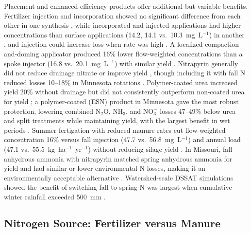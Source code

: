 Placement and enhanced-efficiency products offer additional but variable benefits. Fertilizer injection and incorporation showed no significant difference from each other in one synthesis \parencite{Liu2021}, while incorporated and injected applications had higher concentrations than surface applications (14.2, 14.1 vs.\ 10.3~mg~L$^{-1}$) in another \parencite{Hertzberger2019}, and injection could increase loss when rate was high \parencite{Jeong2018}. A localized-compaction-and-doming applicator produced 16\% lower flow-weighted concentrations than a spoke injector (16.8 vs.\ 20.1~mg~L$^{-1}$) with similar yield \parencite{Bakhsh2010}. Nitrapyrin generally did not reduce drainage nitrate or improve yield \parencite{Vetsch2019,Pittelkow2017}, though including it with fall N reduced losses 10--18\% in Minnesota rotations \parencite{Randall2003,Randall2005}. Polymer-coated urea increased yield 20\% without drainage but did not consistently outperform non-coated urea for yield \parencite{Nash2015,Nash2015b}; a polymer-coated (ESN) product in Minnesota gave the most robust protection, lowering combined N$_2$O, NH$_3$, and NO$_3^-$ losses 47--49\% below urea and split treatments while maintaining yield, with the largest benefit in wet periods \parencite{Menegaz2025}. Summer fertigation with reduced manure rates cut flow-weighted concentration 16\% versus fall injection (47.7 vs.\ 56.8~mg~L$^{-1}$) and annual load (47.1 vs.\ 55.5~kg~ha$^{-1}$~yr$^{-1}$) without reducing silage yield \parencite{Gamble2018}. In Missouri, fall anhydrous ammonia with nitrapyrin matched spring anhydrous ammonia for yield and had similar or lower environmental N losses, making it an environmentally acceptable alternative \parencite{Kaur2024,Kaur2024c}. Watershed-scale DSSAT simulations showed the benefit of switching fall-to-spring N was largest when cumulative winter rainfall exceeded 500~mm \parencite{Banger2018}.

\subsection{Nitrogen Source: Fertilizer versus Manure}

